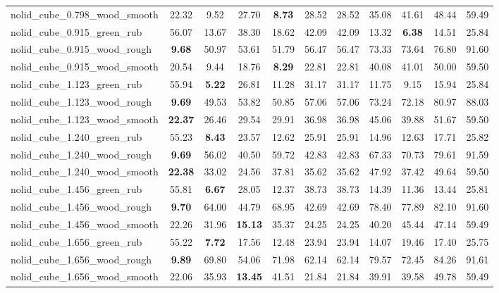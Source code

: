 \begin{table}[H]
{\begin{tabular}{l cccccccccc}
        nolid\_cube\_0.798\_wood\_smooth & 22.32 & 9.52 & 27.70 & \textbf{8.73} & 28.52 & 28.52 & 35.08 & 41.61 & 48.44 & 59.49 \\
        nolid\_cube\_0.915\_green\_rub & 56.07 & 13.67 & 38.30 & 18.62 & 42.09 & 42.09 & 13.32 & \textbf{6.38} & 14.51 & 25.84 \\
        nolid\_cube\_0.915\_wood\_rough & \textbf{9.68} & 50.97 & 53.61 & 51.79 & 56.47 & 56.47 & 73.33 & 73.64 & 76.80 & 91.60 \\
        nolid\_cube\_0.915\_wood\_smooth & 20.54 & 9.44 & 18.76 & \textbf{8.29} & 22.81 & 22.81 & 40.08 & 41.01 & 50.00 & 59.50 \\
        nolid\_cube\_1.123\_green\_rub & 55.94 & \textbf{5.22} & 26.81 & 11.28 & 31.17 & 31.17 & 11.75 & 9.15 & 15.94 & 25.84 \\
        nolid\_cube\_1.123\_wood\_rough & \textbf{9.69} & 49.53 & 53.82 & 50.85 & 57.06 & 57.06 & 73.24 & 72.18 & 80.97 & 88.03 \\
        nolid\_cube\_1.123\_wood\_smooth & \textbf{22.37} & 26.46 & 29.54 & 29.91 & 36.98 & 36.98 & 45.06 & 39.88 & 51.67 & 59.50 \\
        nolid\_cube\_1.240\_green\_rub & 55.23 & \textbf{8.43} & 23.57 & 12.62 & 25.91 & 25.91 & 14.96 & 12.63 & 17.71 & 25.82 \\
        nolid\_cube\_1.240\_wood\_rough & \textbf{9.69} & 56.02 & 40.50 & 59.72 & 42.83 & 42.83 & 67.33 & 70.73 & 79.61 & 91.59 \\
        nolid\_cube\_1.240\_wood\_smooth & \textbf{22.38} & 33.02 & 24.56 & 37.81 & 35.62 & 35.62 & 47.92 & 37.42 & 49.64 & 59.50 \\
        nolid\_cube\_1.456\_green\_rub & 55.81 & \textbf{6.67} & 28.05 & 12.37 & 38.73 & 38.73 & 14.39 & 11.36 & 13.44 & 25.81 \\
        nolid\_cube\_1.456\_wood\_rough & \textbf{9.70} & 64.00 & 44.79 & 68.95 & 42.69 & 42.69 & 78.40 & 77.89 & 82.10 & 91.60 \\
        nolid\_cube\_1.456\_wood\_smooth & 22.26 & 31.96 & \textbf{15.13} & 35.37 & 24.25 & 24.25 & 40.20 & 45.44 & 47.14 & 59.49 \\
        nolid\_cube\_1.656\_green\_rub & 55.22 & \textbf{7.72} & 17.56 & 12.48 & 23.94 & 23.94 & 14.07 & 19.46 & 17.40 & 25.75 \\
        nolid\_cube\_1.656\_wood\_rough & \textbf{9.89} & 69.80 & 54.06 & 71.98 & 62.14 & 62.14 & 79.57 & 72.45 & 84.26 & 91.61 \\
        nolid\_cube\_1.656\_wood\_smooth & 22.06 & 35.93 & \textbf{13.45} & 41.51 & 21.84 & 21.84 & 39.91 & 39.58 & 49.78 & 59.49 \\

\end{tabular}}
\end{table}
